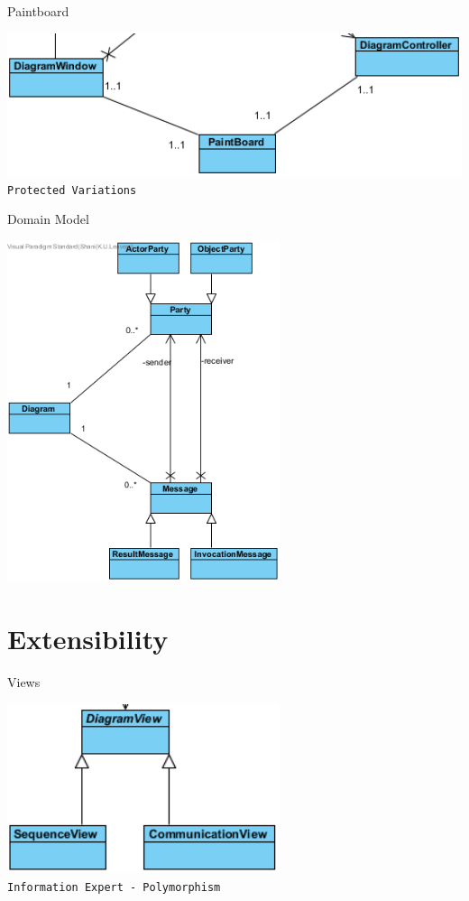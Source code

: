 \documentclass[10pt]{beamer}
\begin{document}
\begin{frame}[fragile]{Paintboard}
\begin{center}
\includegraphics[width=1\textwidth]{diagram7}
\vspace{0.5cm}\\\texttt{Protected Variations}
\end{center}
\end{frame}

\begin{frame}[fragile]{Domain Model}
	\begin{center}
	\includegraphics[width=0.6\textwidth]{diagram3}
	\end{center}
\end{frame}

\section{Extensibility}

\begin{frame}[fragile]{Views}
	\begin{center}
	\includegraphics[width=0.6\textwidth]{diagram6}
	\vspace{0.5cm}\\\texttt{Information Expert - Polymorphism}
	\end{center}
\end{frame}
\end{document}

